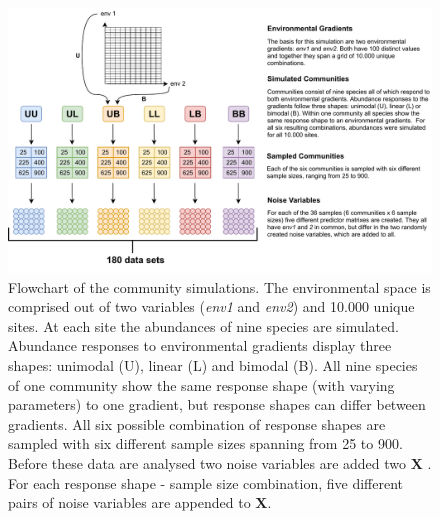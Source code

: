 \documentclass[a4paper,11pt]{article}
\begin{document}
		\begin{figure}[ht]
			\centering
			\includegraphics[width=1\linewidth]{figures/190917_MTP_MM_FLOWCHART.pdf}
			\caption{
			        Flowchart of the community simulations. 
			        The environmental space is comprised out of two variables (\textit{env1} and \textit{env2}) and 10.000 unique sites.
			        At each site the abundances of nine species are simulated. 
			        Abundance responses to environmental gradients display three shapes:
			        unimodal (U), linear (L) and bimodal (B). 
			         All nine species of one community show the same response shape (with varying parameters) to one gradient, but response shapes can differ between gradients. 
			         All six possible combination of response shapes are sampled with six different sample sizes spanning from 25 to 900.
                    Before these data are analysed two noise variables are added two $\mathbf{X}$ .
                    For each response shape - sample size combination, five different pairs of noise variables are appended to $\mathbf{X}$. 
			        }
			\label{fig:flowchart_simulation}
		\end{figure}
	
	    
\end{document}
